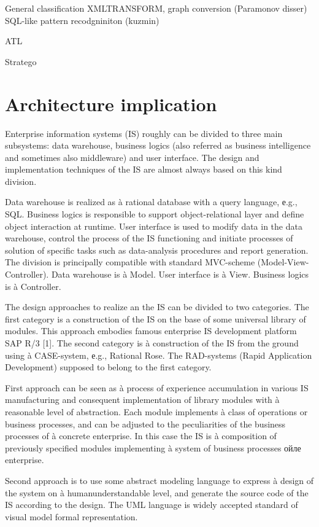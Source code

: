 \documentclass{intech}
\begin{document}
General classification XMLTRANSFORM, graph conversion (Paramonov disser) SQL-like pattern recodgniniton (kuzmin)

ATL

Stratego



\section{Architecture implication}
\label{sec:arch-imp}

Enterprise information systems (IS) roughly can be divided to three main subsystems: data warehouse, business logics (also referred as business intelligence and sometimes also middleware) and user interface. The design and implementation techniques of the IS are almost always based on this kind division.

Data warehouse is realized as à rational database with a query language, е.g., SQL. Business logics is responsible to support object-relational layer and define object interaction at runtime. User interface is used to modify data in the data warehouse, control the process of the IS functioning and initiate processes of solution of specific tasks such as data-analysis procedures and report generation. The division is principally compatible with standard MVC-scheme (Model-View-Controller). Data warehouse is à Model. User interface is à View. Business logics is à Controller.

The design approaches to realize an the IS can be divided to two categories. The first category is a construction of the IS on the base of some universal library of modules. This approach embodies famous enterprise IS development platform SAP R/3 [1]. The second category is à construction of the IS from the ground using à CASE-system, е.g., Rational Rose. The RAD-systems (Rapid Application Development) supposed to belong to the first category.

First approach can be seen as à process of experience accumulation in various IS manufacturing and consequent implementation of library modules with à reasonable level of abstraction. Each module implements à class of operations or business processes, and can be adjusted to the peculiarities of the business processes of à concrete enterprise. In this case the IS is à composition of previously specified modules implementing à system of business processes ойле enterprise.

Second approach is to use some abstract modeling language to express à design of the system on à humanunderstandable level, and generate the source code of the IS according to the design. The UML language \cite{b2} is widely accepted standard of visual model formal
representation.
\end{document}
